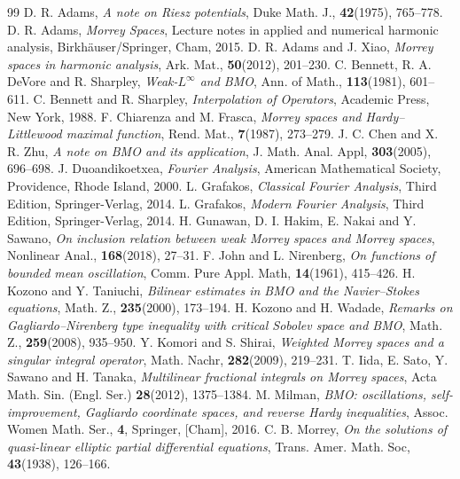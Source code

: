 \documentclass{birkjour}
\theoremstyle{definition}
\theoremstyle{remark}
\numberwithin{equation}{section}
\begin{document}
\begin{thebibliography}{99}
D. R. Adams, \textit{A note on Riesz potentials}, Duke Math. J., \textbf{42}(1975), 765--778.
D. R. Adams, \textit{Morrey Spaces}, Lecture notes in applied and numerical harmonic analysis, Birkh\"{a}user/Springer, Cham, 2015.
D. R. Adams and J. Xiao, \textit{Morrey spaces in harmonic analysis}, Ark. Mat., \textbf{50}(2012), 201--230.
C. Bennett, R. A. DeVore and R. Sharpley, \textit{Weak-$L^{\infty}$ and BMO}, Ann. of Math., \textbf{113}(1981), 601--611.
C. Bennett and R. Sharpley, \textit{Interpolation of Operators}, Academic Press, New York, 1988.
F. Chiarenza and M. Frasca, \textit{Morrey spaces and Hardy--Littlewood maximal function}, Rend. Mat., \textbf{7}(1987), 273--279.
J. C. Chen and X. R. Zhu, \textit{A note on BMO and its application}, J. Math. Anal. Appl, \textbf{303}(2005), 696--698.
J. Duoandikoetxea, \textit{Fourier Analysis}, American Mathematical Society, Providence, Rhode Island, 2000.
L. Grafakos, \textit{Classical Fourier Analysis}, Third Edition, Springer-Verlag, 2014.
L. Grafakos, \textit{Modern Fourier Analysis}, Third Edition, Springer-Verlag, 2014.
H. Gunawan, D. I. Hakim, E. Nakai and Y. Sawano, \textit{On inclusion relation between weak Morrey spaces and Morrey spaces}, Nonlinear Anal., \textbf{168}(2018), 27--31.
F. John and L. Nirenberg, \textit{On functions of bounded mean oscillation}, Comm. Pure Appl. Math,
    \textbf{14}(1961), 415--426.
H. Kozono and Y. Taniuchi, \textit{Bilinear estimates in BMO and the Navier--Stokes equations}, Math. Z., \textbf{235}(2000), 173--194.
H. Kozono and H. Wadade, \textit{Remarks on Gagliardo--Nirenberg type inequality with critical Sobolev space and BMO}, Math. Z., \textbf{259}(2008), 935--950.
Y. Komori and S. Shirai, \textit{Weighted Morrey spaces and a singular integral operator}, Math. Nachr, \textbf{282}(2009), 219--231.
T. Iida, E. Sato, Y. Sawano and H. Tanaka, \textit{Multilinear fractional integrals on Morrey spaces}, Acta Math. Sin. (Engl. Ser.) \textbf{28}(2012), 1375--1384.
M. Milman, \textit{BMO: oscillations, self-improvement, Gagliardo coordinate spaces, and reverse Hardy inequalities},  Assoc. Women Math. Ser., \textbf{4}, Springer, [Cham], 2016.
C. B. Morrey, \textit{On the solutions of quasi-linear elliptic partial differential equations}, Trans. Amer. Math. Soc, \textbf{43}(1938), 126--166.

\end{thebibliography}
\end{document}
